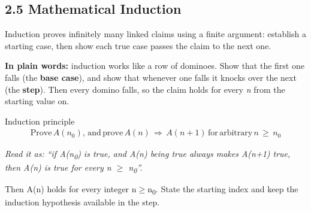 \documentclass[11pt]{article}
\begin{document}
\begin{keepsection}
\section{2.5 Mathematical Induction}

Induction proves infinitely many linked claims using a finite argument: establish a starting case, then show each true case passes the claim to the next one.

\begin{plainbox}\textbf{In plain words:} induction works like a row of dominoes. Show that the first one falls (the \textbf{base case}), and show that whenever one falls it knocks over the next (the \textbf{step}). Then every domino falls, so the claim holds for every \textit{n} from the starting value on.\end{plainbox}

\begin{equationcard}{Induction principle}
\[ \begin{gathered} \text{Prove}\, {A}({n}_{0}),\, \text{and}\, \text{prove}\, {A}({n})\, \Rightarrow \, {A}({n}+1)\, \text{for}\, \text{arbitrary}\, {n}\, \geq \, {n}_{0} \end{gathered} \]
{\small \emph{Read it as: “if A(n\textsubscript{0}) is true, and A(n) being true always makes A(n+1) true, then A(n) is true for every n \ensuremath{\geq} n\textsubscript{0}”.}\par Then A(n) holds for every integer n\ensuremath{\geq}n\textsubscript{0}. State the starting index and keep the induction hypothesis available in the step.}
\end{equationcard}


\end{keepsection}
\end{document}
